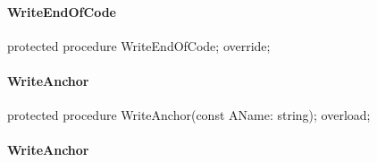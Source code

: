 \documentclass{report}
\newif\ifpdf
\begin{document}
\paragraph*{WriteEndOfCode}\hspace*{\fill}

\label{PasDoc_GenHtml.TGenericHTMLDocGenerator-WriteEndOfCode}
\begin{list}{}{
\setlength{\itemindent}{0cm}
\setlength{\listparindent}{0cm}
\setlength{\leftmargin}{\evensidemargin}
\addtolength{\leftmargin}{\tmplength}
\settowidth{\labelsep}{X}
\addtolength{\leftmargin}{\labelsep}
\setlength{\labelwidth}{\tmplength}
}
\item[\textbf{Declaration}\hfill]
\ifpdf
\begin{flushleft}
\fi
\begin{ttfamily}
protected procedure WriteEndOfCode; override;\end{ttfamily}

\ifpdf
\end{flushleft}
\fi

\end{list}
\paragraph*{WriteAnchor}\hspace*{\fill}

\label{PasDoc_GenHtml.TGenericHTMLDocGenerator-WriteAnchor}
\begin{list}{}{
\setlength{\itemindent}{0cm}
\setlength{\listparindent}{0cm}
\setlength{\leftmargin}{\evensidemargin}
\addtolength{\leftmargin}{\tmplength}
\settowidth{\labelsep}{X}
\addtolength{\leftmargin}{\labelsep}
\setlength{\labelwidth}{\tmplength}
}
\item[\textbf{Declaration}\hfill]
\ifpdf
\begin{flushleft}
\fi
\begin{ttfamily}
protected procedure WriteAnchor(const AName: string); overload;\end{ttfamily}

\ifpdf
\end{flushleft}
\fi

\end{list}
\paragraph*{WriteAnchor}\hspace*{\fill}
\end{document}
